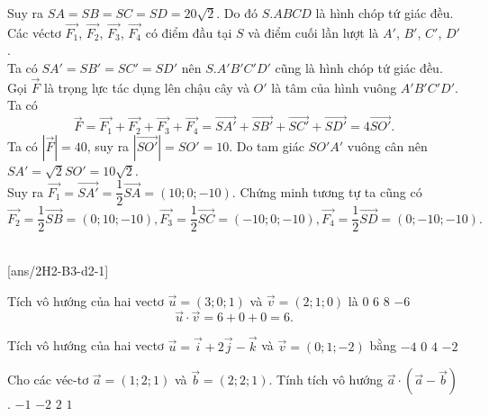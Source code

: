 \begin{vd}
{		Suy ra $SA = SB = SC = SD = 20\sqrt{2}$. Do đó $S.ABCD$ là hình chóp tứ giác đều.
		Các véctơ $\overrightarrow{F_1}$, $\overrightarrow{F_2}$, $\overrightarrow{F_3}$, $\overrightarrow{F_4}$ có điểm đầu tại $S$ và điểm cuối lần lượt là $A'$, $B'$, $C'$, $D'$.\\
			Ta có $SA' = SB' = SC' = SD'$ nên $S.A'B'C'D'$ cũng là hình chóp tứ giác đều.\\
			Gọi $\overrightarrow{F} $ là trọng lực tác dụng lên chậu cây và $O'$ là tâm của hình vuông $A'B'C'D'$. Ta có
			\[ \overrightarrow{F} =\overrightarrow{F_1} + \overrightarrow{F_2}+ \overrightarrow{F_3}+ \overrightarrow{F_4} = \overrightarrow{SA'} + \overrightarrow{SB'}+ \overrightarrow{SC'}+ \overrightarrow{SD'} = 4\overrightarrow{SO'}.\]
			Ta có $\left| \overrightarrow{F} \right| =40$, suy ra $\left| \overrightarrow{SO'} \right| = SO' = 10$.
			Do tam giác $SO'A'$ vuông cân nên $SA' = \sqrt{2}SO' = 10\sqrt{2}$.\\
		Suy ra $\overrightarrow{F_1} = \overrightarrow{SA'} = \dfrac{1}{2}\overrightarrow{SA}  = (10; 0; -10)$.
		Chứng minh tương tự ta cũng có\\
		\[ \overrightarrow{F_2} = \dfrac{1}{2}\overrightarrow{SB}  = (0; 10; -10), \overrightarrow{F_3} = \dfrac{1}{2}\overrightarrow{SC}  = (-10; 0; -10), \overrightarrow{F_4} = \dfrac{1}{2}\overrightarrow{SD}  = (0; -10; -10). \]
	}
\end{vd}
 \\
\setcounter{ex}{0}
[ans/2H2-B3-d2-1]

\begin{ex}
	Tích vô hướng của hai vectơ $\vec{u}=(3;0;1)$ và $\vec{v}=(2;1;0)$ là
	\choice
	{$0$}
	{\True$6$}
	{$8$}
	{$-6$}
	\loigiai
	{
		$$\vec{u}\cdot\vec{v}=6+0+0=6.$$
	}
\end{ex} 

\begin{ex}
	Tích vô hướng của hai vectơ $\vec{u} = \vec{i} + 2 \vec{j} - \vec{k}$ và $ \vec{v} = (0;1; -2)$ bằng
	\choice
	{$ -4 $}
	{$ 0 $}
	{\True $ 4 $}
	{$ -2 $}
\end{ex} 


\begin{ex}
	Cho các véc-tơ $\vec{a}=(1;2;1)$ và $\vec{b}=(2;2;1)$. Tính tích vô hướng $\vec{a} \cdot \left(\vec{a}-\vec{b}\right)$.
	\choice
	{\True $-1$}
	{$-2$}
	{$2$}
	{$1$}
\end{ex} 

